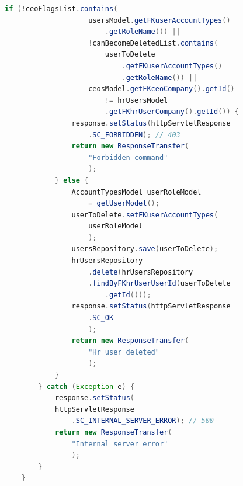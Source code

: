 \documentclass[twoside]{projektInzynierskiMS}
\numberwithin{figure}{section}
\begin{document}
\begin{lstlisting}[language=Java,caption=Implementacja metody DELETE na przykładzie usunięcia użytkownika z działu HR. Źródło: Opracowanie własne.,captionpos=b]
            if (!ceoFlagsList.contains(
                    usersModel.getFKuserAccountTypes()
                        .getRoleName()) ||
                    !canBecomeDeletedList.contains(
                        userToDelete
                            .getFKuserAccountTypes()
                            .getRoleName()) ||
                    ceosModel.getFKceoCompany().getId() 
                        != hrUsersModel
                        .getFKhrUserCompany().getId()) {
                response.setStatus(httpServletResponse
                    .SC_FORBIDDEN); // 403
                return new ResponseTransfer(
                    "Forbidden command"
                    );
            } else {
                AccountTypesModel userRoleModel 
                    = getUserModel();
                userToDelete.setFKuserAccountTypes(
                    userRoleModel
                    );
                usersRepository.save(userToDelete);
                hrUsersRepository
                    .delete(hrUsersRepository
                    .findByFKhrUserUserId(userToDelete
                        .getId()));
                response.setStatus(httpServletResponse
                    .SC_OK
                    );
                return new ResponseTransfer(
                    "Hr user deleted"
                    );
            }
        } catch (Exception e) {
            response.setStatus(
            httpServletResponse
                .SC_INTERNAL_SERVER_ERROR); // 500
            return new ResponseTransfer(
                "Internal server error"
                );
        }
    }
\end{lstlisting}
\end{document}
